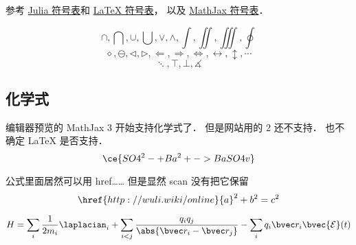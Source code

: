 
参考 \href{https://docs.julialang.org/en/v1/manual/unicode-input/}{Julia 符号表}和 \href{https://oeis.org/wiki/List_of_LaTeX_mathematical_symbols}{LaTeX 符号表}， 以及 \href{http://www.onemathematicalcat.org/MathJaxDocumentation/TeXSyntax.htm#U}{MathJax 符号表}．

\begin{equation}
\cap, \bigcap, \cup, \bigcup, \vee, \wedge, \int, \iint, \iiint, \oint
\end{equation}
\begin{equation}
\diamond, \ominus, \triangleleft, \triangleright, \Longleftarrow, \Longrightarrow, \iff, \leftrightarrow, \updownarrow, \cdots
\end{equation}
\begin{equation}
\ddots, \top, \bot, \measuredangle
\end{equation}

\subsection{化学式}
编辑器预览的 MathJax 3 开始支持化学式了． 但是网站用的 2 还不支持． 也不确定 LaTeX 是否支持．
\begin{equation}
\ce{SO4^2- + Ba^2+ -> BaSO4 v}
\end{equation}

公式里面居然可以用 href…… 但是显然 scan 没有把它保留
\begin{equation}
\href{http://wuli.wiki/online}{a}^2 + b^2 = c^2
\end{equation}


\begin{equation}
H = \sum_i \frac{1}{2m_i} \laplacian_i + \sum_{i<j}\frac{q_i q_j}{\abs{\bvec r_i - \bvec r_j}} - \sum_i q_i \bvec r_i\bvec{\mathcal{E}}(t)
\end{equation}
